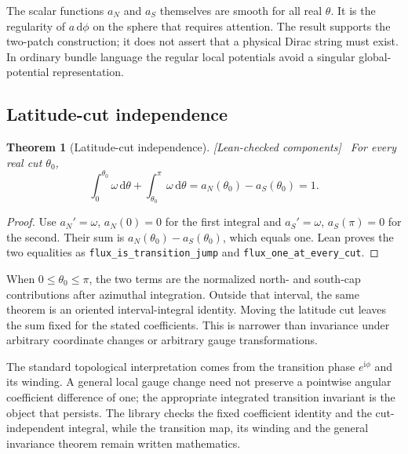 \documentclass[11pt]{article}
\newtheorem{theorem}{Theorem}[section]
\theoremstyle{definition}\newtheorem{definition}[theorem]{Definition}
\theoremstyle{remark}\newtheorem{remark}[theorem]{Remark}
\newcommand{\ii}{\mathrm{i}}
\newcommand{\dd}{\mathrm{d}}
\newcommand{\checked}{\textnormal{\small[Lean-checked components]}\ }
\begin{document}
The scalar functions $a_N$ and $a_S$ themselves are smooth for all real $\theta$. It is the regularity of $a\,\dd\phi$ on the sphere that requires attention. The result supports the two-patch construction; it does not assert that a physical Dirac string must exist. In ordinary bundle language the regular local potentials avoid a singular global-potential representation.

\subsection{Latitude-cut independence}
\begin{theorem}[Latitude-cut independence]\label{thm:cut}\checked
For every real cut $\theta_0$,
\hypertarget{eq:cut}{}
\begin{equation}
 \int_0^{\theta_0}\omega\,\dd\theta+
 \int_{\theta_0}^{\pi}\omega\,\dd\theta
 =a_N(\theta_0)-a_S(\theta_0)=1.
\end{equation}
\end{theorem}
\begin{proof}
Use $a_N'=\omega$, $a_N(0)=0$ for the first integral and $a_S'=\omega$, $a_S(\pi)=0$ for the second. Their sum is $a_N(\theta_0)-a_S(\theta_0)$, which equals one. Lean proves the two equalities as \texttt{flux\_is\_transition\_jump} and \texttt{flux\_one\_at\_every\_cut}.
\end{proof}
When $0\leq\theta_0\leq\pi$, the two terms are the normalized north- and south-cap contributions after azimuthal integration. Outside that interval, the same theorem is an oriented interval-integral identity. Moving the latitude cut leaves the sum fixed for the stated coefficients. This is narrower than invariance under arbitrary coordinate changes or arbitrary gauge transformations.

The standard topological interpretation comes from the transition phase $e^{\ii\phi}$ and its winding. A general local gauge change need not preserve a pointwise angular coefficient difference of one; the appropriate integrated transition invariant is the object that persists. The library checks the fixed coefficient identity and the cut-independent integral, while the transition map, its winding and the general invariance theorem remain written mathematics.
\end{document}
